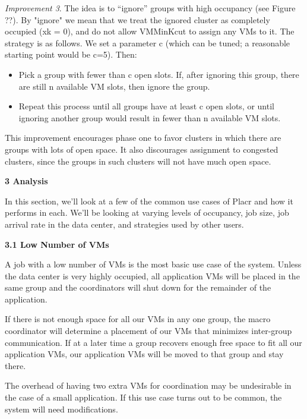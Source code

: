 \documentclass[11pt]{article}
\begin{document}
\textit{Improvement 3}. The idea is to “ignore” groups with high occupancy (see Figure ??).  By "ignore" we mean that we treat the ignored cluster as completely occupied (xk = 0), and do not allow VMMinKcut to assign any VMs to it.  The strategy is as follows.  We set a parameter c (which can be tuned; a reasonable starting point would be c=5).  Then:
\vspace{-4mm}
\begin{itemize}
  \item 
Pick a group with fewer than c open slots.  If, after ignoring this group, there are still n available VM slots, then ignore the group.
  \item
Repeat this process until all groups have at least c open slots, or until ignoring another group would result in fewer than n available VM slots.
\end{itemize}

This improvement encourages phase one to favor clusters in which there are groups with lots of open space.  It also discourages assignment to congested clusters, since the groups in such clusters will not have much open space.





\FloatBarrier
\LARGE{\textbf{3 Analysis}}

\normalsize

In this section, we’ll look at a few of the common use cases of Placr and how it performs in each.  We’ll be looking at varying levels of occupancy, job size, job arrival rate in the data center, and strategies used by other users.

\Large{\textbf{3.1 Low Number of VMs}}

\normalsize
A job with a low number of VMs is the most basic use case of the system.  Unless the data center is very highly occupied, all application VMs will be placed in the same group and the coordinators will shut down for the remainder of the application.

If there is not enough space for all our VMs in any one group, the macro coordinator will determine a placement of our VMs that minimizes inter-group communication.  If at a later time a group recovers enough free space to fit all our application VMs, our application VMs will be moved to that group and stay there.

The overhead of having two extra VMs for coordination may be undesirable in the case of a small application.  If this use case turns out to be common, the system will need modifications.
\end{document}
